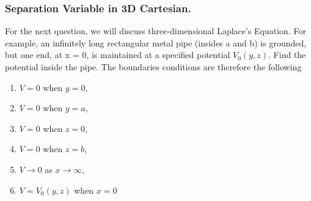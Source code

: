 \documentclass[../../../main.tex]{subfiles}
\begin{document}
\subsubsection{Separation Variable in 3D Cartesian.} For the next question, we will discuss three-dimensional Laplace's Equation. For example, an infinitely long rectangular metal pipe (insides a and b) is grounded, but one end, at x = 0, is maintained at a specified potential $V_0(y, z)$. Find the potential inside the pipe. The boundaries conditions are therefore the following
\begin{enumerate}
    \item $V = 0$ when $y = 0$,
    \item $V = 0$ when $y = a$,
    \item $V = 0$ when $z = 0$,
    \item $V = 0$ when $z = b$,
    \item $V \rightarrow 0$ as $x \rightarrow \infty$,
    \item$ V = V_0(y, z)$ when $x = 0$
\end{enumerate}
\begin{figure*}[ht]
    \centering
\end{figure*}
\end{document}
